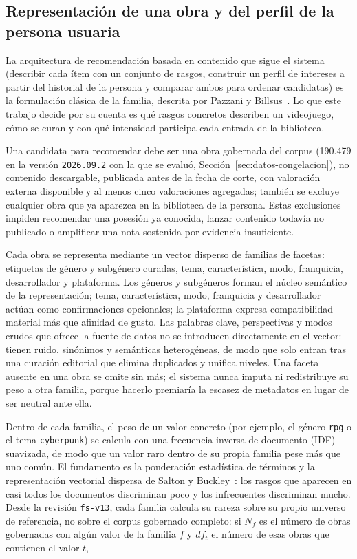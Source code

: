 \subsection{Representación de una obra y del perfil de la persona usuaria}\label{sec:alg-representacion}

La arquitectura de recomendación basada en contenido que sigue el sistema (describir cada ítem
con un conjunto de rasgos, construir un perfil de intereses a partir del historial de la
persona y comparar ambos para ordenar candidatas) es la formulación clásica de la familia,
descrita por Pazzani y Billsus~\cite{pazzani2007content}. Lo que este trabajo decide por su
cuenta es qué rasgos concretos describen un videojuego, cómo se curan y con qué intensidad
participa cada entrada de la biblioteca.

Una candidata para recomendar debe ser una obra gobernada del corpus (190.479 en la versión
\texttt{2026.09.2} con la que se evaluó, Sección~\ref{sec:datos-congelacion}), no contenido
descargable, publicada antes de la fecha de corte, con valoración externa disponible y al
menos cinco valoraciones agregadas; también se excluye cualquier obra que ya aparezca en la
biblioteca de la persona. Estas exclusiones impiden recomendar una posesión ya conocida,
lanzar contenido todavía no publicado o amplificar una nota sostenida por evidencia
insuficiente.

Cada obra se representa mediante un vector disperso de familias de facetas: etiquetas de
género y subgénero curadas, tema, característica, modo, franquicia, desarrollador y
plataforma. Los géneros y subgéneros forman el núcleo semántico de la representación; tema,
característica, modo, franquicia y desarrollador actúan como confirmaciones opcionales; la
plataforma expresa compatibilidad material más que afinidad de gusto. Las palabras clave,
perspectivas y modos crudos que ofrece la fuente de datos no se introducen directamente en el
vector: tienen ruido, sinónimos y semánticas heterogéneas, de modo que solo entran tras una
curación editorial que elimina duplicados y unifica niveles. Una faceta ausente en una obra se
omite sin más; el sistema nunca imputa ni redistribuye su peso a otra familia, porque hacerlo
premiaría la escasez de metadatos en lugar de ser neutral ante ella.

Dentro de cada familia, el peso de un valor concreto (por ejemplo, el género \texttt{rpg} o el
tema \texttt{cyberpunk}) se calcula con una frecuencia inversa de documento (IDF) suavizada, de modo
que un valor raro dentro de su propia familia pese más que uno común. El fundamento es la
ponderación estadística de términos y la representación vectorial dispersa de Salton y
Buckley~\cite{salton1988term}: los rasgos que aparecen en casi todos los documentos
discriminan poco y los infrecuentes discriminan mucho. Desde la revisión \texttt{fs-v13}, cada
familia calcula su rareza sobre su propio universo de referencia, no sobre el corpus gobernado
completo: si \(N_f\) es el número de obras gobernadas con algún valor de la familia \(f\) y
\(df_t\) el número de esas obras que contienen el valor \(t\),

